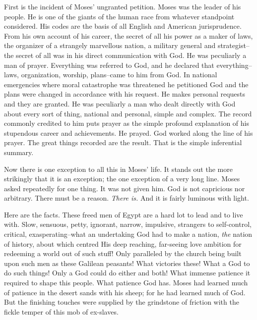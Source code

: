 First is the incident of Moses' ungranted petition. Moses was the leader
of his people. He is one of the giants of the human race from whatever
standpoint considered. His codes are the basis of all English and American
jurisprudence. From his own account of his career, the secret of all his
power as a maker of laws, the organizer of a strangely marvellous nation,
a military general and strategist--the secret of all was in his direct
communication with God. He was peculiarly a man of prayer. Everything was
referred to God, and he declared that everything--laws, organization,
worship, plans--came to him from God. In national emergencies where moral
catastrophe was threatened he petitioned God and the plans were changed in
accordance with his request. He makes personal requests and they are
granted. He was peculiarly a man who dealt directly with God about every
sort of thing, national and personal, simple and complex. The record
commonly credited to him puts prayer as the simple profound explanation of
his stupendous career and achievements. He prayed. God worked along the
line of his prayer. The great things recorded are the result. That is the
simple inferential summary.

Now there is one exception to all this in Moses' life. It stands out the
more strikingly that it is an exception; the one exception of a very long
line. Moses asked repeatedly for one thing. It was not given him. God is
not capricious nor arbitrary. There must be a reason. \textit{There is.} And it
is fairly luminous with light.

Here are the facts. These freed men of Egypt are a hard lot to lead and to
live with. Slow, sensuous, petty, ignorant, narrow, impulsive, strangers
to self-control, critical, exasperating--what an undertaking God had to
make a nation, \textit{the} nation of history, about which centred His deep
reaching, far-seeing love ambition for redeeming a world out of such
stuff! Only paralleled by the church being built upon such men as these
Galilean peasants! What victories these! What a God to do such things!
Only a God could do either and both! What immense patience it required to
shape this people. What patience God has. Moses had learned much of
patience in the desert sands with his sheep; for he had learned much of
God. But the finishing touches were supplied by the grindstone of friction
with the fickle temper of this mob of ex-slaves.

